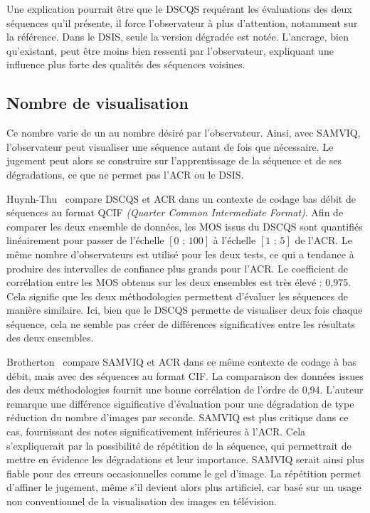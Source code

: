 Une explication pourrait être que le DSCQS requérant les évaluations des deux séquences qu'il présente, il force l'observateur à plus d'attention, notamment sur la référence. Dans le DSIS, seule la version dégradée est notée. L'ancrage, bien qu'existant, peut être moins bien ressenti par l'observateur, expliquant une influence plus forte des qualités des séquences voisines.


\subsection{Nombre de visualisation}
Ce nombre varie de un au nombre désiré par l'observateur. Ainsi, avec SAMVIQ, l'observateur peut visualiser une séquence autant de fois que nécessaire. Le jugement peut alors se construire sur l'apprentissage de la séquence et de ses dégradations, ce que ne permet pas l'ACR ou le DSIS.

Huynh-Thu~\cite{huynhthu-sip2005} compare DSCQS et ACR dans un contexte de codage bas débit de séquences au format QCIF \emph{(Quarter Common Intermediate Format)}. Afin de comparer les deux ensemble de données, les MOS issus du DSCQS sont quantifiés linéairement pour passer de l'échelle $[\text{0 ; }\text{100}]$ à l'échelle $[\text{1 ; }\text{5}]$ de l'ACR. Le même nombre d'observateurs est utilisé pour les deux tests, ce qui a tendance à produire des intervalles de confiance plus grands pour l'ACR. Le coefficient de corrélation entre les MOS obtenus sur les deux ensembles est très élevé : 0,975. Cela signifie que les deux méthodologies permettent d'évaluer les séquences de manière similaire. Ici, bien que le DSCQS permette de visualiser deux fois chaque séquence, cela ne semble pas créer de différences significatives entre les résultats des deux ensembles.

Brotherton~\cite{brotherton-ieice2006} compare SAMVIQ et ACR dans ce même contexte de codage à bas débit, mais avec des séquences au format CIF. La comparaison des données issues des deux méthodologies fournit une bonne corrélation de l'ordre de 0,94. L'auteur remarque une différence significative d'évaluation pour une dégradation de type réduction du nombre d'images par seconde. SAMVIQ est plus critique dans ce cas, fournissant des notes significativement inférieures à l'ACR. Cela s'expliquerait par la possibilité de répétition de la séquence, qui permettrait de mettre en évidence les dégradations et leur importance. SAMVIQ serait ainsi plus fiable pour des erreurs occasionnelles comme le gel d'image. La répétition permet d'affiner le jugement, même s'il devient alors plus artificiel, car basé sur un usage non conventionnel de la visualisation des images en télévision.


